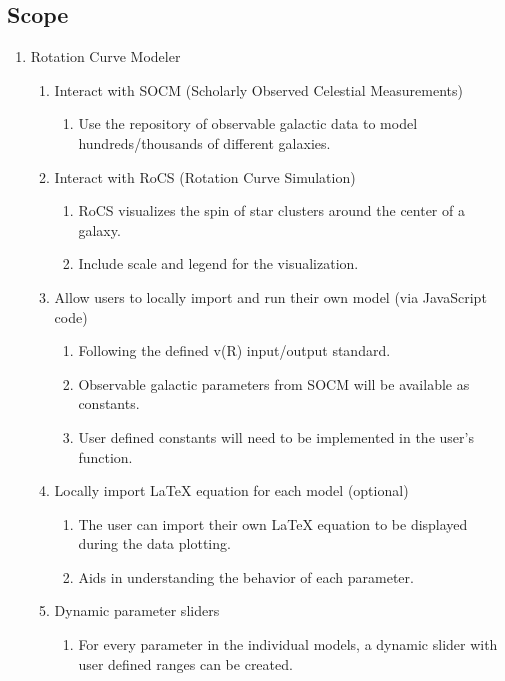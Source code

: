\documentclass[titlepage]{article}
\begin{document}
\subsection{Scope}
\begin{enumerate}
	\item Rotation Curve Modeler
	
  \begin{enumerate}	 	
    \item Interact with SOCM (Scholarly Observed Celestial Measurements)
	\begin{enumerate}
		\item Use the repository of observable galactic data to model hundreds/thousands of different galaxies.
	\end{enumerate}
    \item Interact with RoCS (Rotation Curve Simulation)
	\begin{enumerate}
		\item RoCS visualizes the spin of star clusters around the center of a galaxy. 
		\item Include scale and legend for the visualization.
	\end{enumerate}
    \item Allow users to locally import and run their own model (via JavaScript code)
	\begin{enumerate}
		\item Following the defined v(R) input/output standard.
		\item Observable galactic parameters from SOCM will be available as constants.
		\item User defined constants will need to be implemented in the user's function.
	\end{enumerate}
    \item Locally import LaTeX equation for each model (optional)
	\begin{enumerate}
		\item The user can import their own LaTeX equation to be displayed during the data plotting.
		\item Aids in understanding the behavior of each parameter.
	\end{enumerate}
	\item Dynamic parameter sliders
	\begin{enumerate}
		\item For every parameter in the individual models, a dynamic slider with user defined ranges can be created.
	\end{enumerate}
  \end{enumerate} 
\end{enumerate} 
\end{document}

